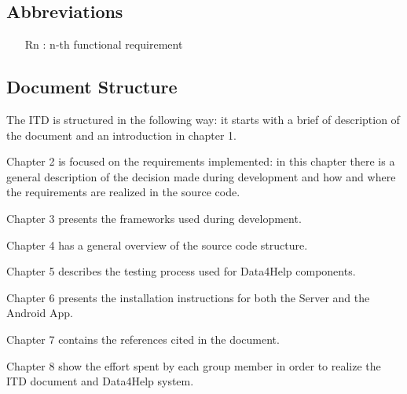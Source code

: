 \subsection{Abbreviations}
\begin{itemize}
\item[Rn]: n-th functional requirement
\end{itemize}

\subsection{Document Structure}

The ITD is structured in the following way:
it starts with a brief of description of the document and an introduction in chapter 1.

Chapter 2 is focused on the requirements implemented: in this chapter there is a general description of the decision made during development and how and where the requirements are realized in the source code.

Chapter 3 presents the frameworks used during development.

Chapter 4 has a general overview of the source code structure.

Chapter 5 describes the testing process used for Data4Help components.

Chapter 6 presents the installation instructions for both the Server and the Android App.

Chapter 7 contains the references cited in the document.

Chapter 8 show the effort spent by each group member in order to realize the ITD document and Data4Help system.